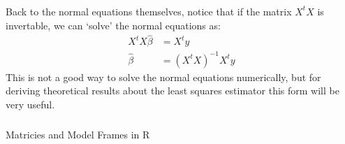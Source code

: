 \begin{frame}[fragile] \frametitle{}

Back to the normal equations themselves, notice that if the
matrix $X^t X$ is invertable, we can `solve' the normal
equations as:
\begin{align*}
X^t X \widehat{\beta} &= X^t y \\
\widehat{\beta} &= (X^t X)^{-1} X^t y
\end{align*}
\pause This is not a good way to solve the normal equations
numerically, but for deriving theoretical results about the
least squares estimator this form will be very useful.

\end{frame}

\begin{frame}[fragile] \frametitle{}

\begin{flushright}
{\color{yaleblue}\sc\fontsize{1cm}{0cm}\selectfont Matricies and Model Frames in R}
\end{flushright}

\end{frame}














